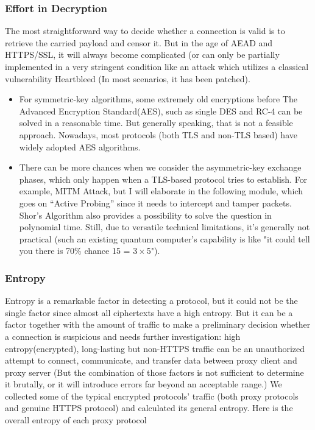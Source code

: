 \documentclass[conference]{IEEEtran}
\begin{document}
\subsubsection{Effort in Decryption}
 The most straightforward way to decide whether a connection is valid is to retrieve the carried payload and censor it. But in the age of AEAD and HTTPS/SSL, it will always become complicated (or can only be partially implemented in a very stringent condition like an attack which utilizes a classical vulnerability Heartbleed \cite{Heartbleed} (In most scenarios, it has been patched).
 \begin{itemize}
    \item  For symmetric-key algorithms, some extremely old encryptions before The Advanced Encryption Standard(AES), such as single DES and RC-4 can be solved in a reasonable time. But generally speaking, that is not a feasible approach. Nowadays, most protocols (both TLS and non-TLS based) have widely adopted AES algorithms.
    \item  There can be more chances when we consider the asymmetric-key exchange phases, which only happen when a TLS-based protocol tries to establish. For example, MITM Attack, but I will elaborate in the following module, which goes on “Active Probing” since it needs to intercept and tamper packets. Shor’s Algorithm \cite{Shors_Algorithm} also provides a possibility to solve the question in polynomial time. Still, due to versatile technical limitations, it’s generally not practical (such an existing quantum computer’s capability is like "it could tell you there is 70\% chance 15 = $3\times$5").
 \end{itemize}

\subsubsection{Entropy}
Entropy is a remarkable factor in detecting a protocol, but it could not be the single factor since almost all ciphertexts have a high entropy. But it can be a factor together with the amount of traffic to make a preliminary decision whether a connection is suspicious and needs further investigation: high entropy(encrypted), long-lasting but non-HTTPS traffic can be an unauthorized attempt to connect, communicate, and transfer data between proxy client and proxy server (But the combination of those factors is not sufficient to determine it brutally, or it will introduce errors far beyond an acceptable range.)
We collected some of the typical encrypted protocols' traffic (both proxy protocols and genuine HTTPS protocol) and calculated its general entropy.
Here is the overall entropy of each proxy protocol
\end{document}
